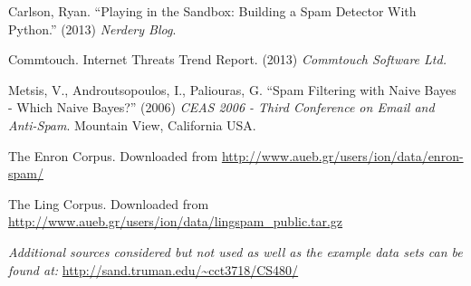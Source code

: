 \documentclass[12pt]{article}
\begin{document}
\begin{flushleft}
Carlson, Ryan.  ``Playing in the Sandbox: Building a Spam Detector With Python.''  (2013)  \textit{Nerdery Blog}.
\end{flushleft}

\begin{flushleft}
Commtouch.  Internet Threats Trend Report. (2013) \textit{Commtouch Software Ltd.}
\end{flushleft}

\begin{flushleft}
Metsis, V., Androutsopoulos, I., Paliouras, G.  ``Spam Filtering with Naive Bayes - Which Naive Bayes?''
(2006)  \textit{CEAS 2006 - Third Conference on Email and Anti-Spam}. Mountain View, California USA.
\end{flushleft}

\begin{flushleft}
The Enron Corpus.  Downloaded from \url{http://www.aueb.gr/users/ion/data/enron-spam/}
\end{flushleft}

\begin{flushleft}
The Ling Corpus.  Downloaded from \url{http://www.aueb.gr/users/ion/data/lingspam_public.tar.gz}
\end{flushleft}

\begin{flushleft}
\textit{Additional sources considered but not used as well as the example data sets can be found at: }
\url{http://sand.truman.edu/~cct3718/CS480/}
\end{flushleft}
\end{document}
